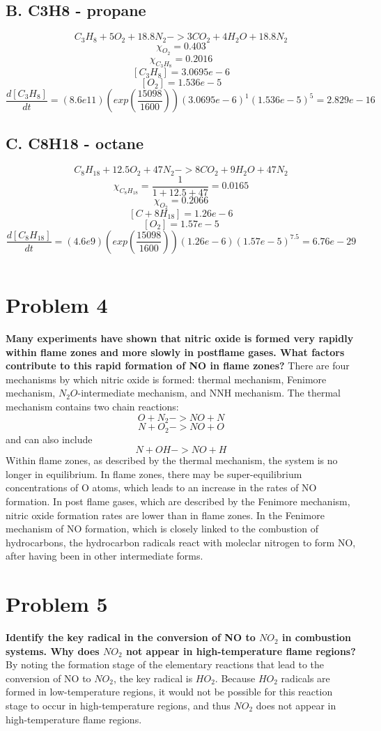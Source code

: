\documentclass{article}
\begin{document}
\subsection*{B. C3H8 - propane}
$$C_3H_8+5O_2+18.8N_2 -> 3CO_2+4H_2O+18.8N_2$$
$$\chi_{O_2}=0.403$$
$$\chi_{C_3H_8}=0.2016$$
$$[C_3H_8]=3.0695e-6$$
$$[O_2]=1.536e-5$$
$$\frac{d[C_3H_8]}{dt}=(8.6e11)(exp(\frac{15098}{1600}))(3.0695e-6)^1(1.536e-5)^5=2.829e-16$$
\subsection*{C. C8H18 - octane}
$$C_8H_{18}+12.5O_2+47N_2 -> 8CO_2+9H_2O+47N_2$$
$$\chi_{C_8H_{18}}=\frac{1}{1+12.5+47}=0.0165$$
$$\chi_{O_2}=0.2066$$
$$[C+8H_{18}]=1.26e-6$$
$$[O_2]=1.57e-5$$
$$\frac{d[C_8H_{18}]}{dt}=(4.6e9)(exp(\frac{15098}{1600}))(1.26e-6)(1.57e-5)^{7.5}=6.76e-29$$

$$$$
\section*{Problem 4}
\textbf{Many experiments have shown that nitric oxide is formed very rapidly within flame zones and more slowly in postflame gases.  What factors contribute to this rapid formation of NO in flame zones? }\newline
\indent There are four mechanisms by which nitric oxide is formed: thermal mechanism, Fenimore mechanism, $N_2O$-intermediate mechanism, and NNH mechanism.  The thermal mechanism contains two chain reactions:
$$O+N_2 -> NO+N$$
$$N+O_2 -> NO+O$$
and can also include 
$$N+OH -> NO+H$$
Within flame zones, as described by the thermal mechanism, the system is no longer in equilibrium.  In flame zones, there may be super-equilibrium concentrations of O atoms, which leads to an increase in the rates of NO formation. \newline
\indent In post flame gases, which are described by the Fenimore mechanism, nitric oxide formation rates are lower than in flame zones.  In the Fenimore mechanism of NO formation, which is closely linked to the combustion of hydrocarbons, the hydrocarbon radicals react with moleclar nitrogen to form NO, after having been in other intermediate forms. 

\section*{Problem 5}
\textbf{Identify the key radical in the conversion of NO to $NO_2$ in combustion systems.  Why does $NO_2$ not appear in high-temperature flame regions?} \newline
\indent By noting the formation stage of the elementary reactions that lead to the conversion of NO to $NO_2$, the key radical is $HO_2$.  Because $HO_2$ radicals are formed in low-temperature regions, it would not be possible for this reaction stage to occur in high-temperature regions, and thus $NO_2$ does not appear in high-temperature flame regions. 
\end{document}
